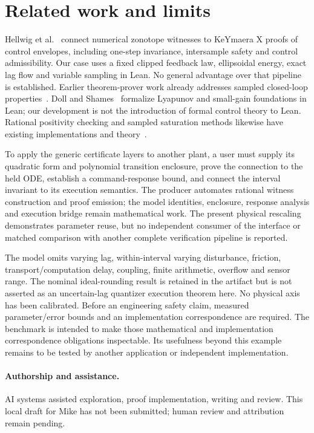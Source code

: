 \documentclass[10pt]{article}
\begin{document}
\section{Related work and limits}
Hellwig et al.~\cite{zonotope} connect numerical zonotope witnesses to KeYmaera X proofs of control envelopes, including one-step invariance, intersample safety and control admissibility. Our case uses a fixed clipped feedback law, ellipsoidal energy, exact lag flow and variable sampling in Lean. No general advantage over that pipeline is established. Earlier theorem-prover work already addresses sampled closed-loop properties~\cite{closedloop}. Doll and Shames~\cite{doll} formalize Lyapunov and small-gain foundations in Lean; our development is not the introduction of formal control theory to Lean. Rational positivity checking and sampled saturation methods likewise have existing implementations and theory~\cite{sos,palmeira}.

To apply the generic certificate layers to another plant, a user must supply its quadratic form and polynomial transition enclosure, prove the connection to the held ODE, establish a command-response bound, and connect the interval invariant to its execution semantics. The producer automates rational witness construction and proof emission; the model identities, enclosure, response analysis and execution bridge remain mathematical work. The present physical rescaling demonstrates parameter reuse, but no independent consumer of the interface or matched comparison with another complete verification pipeline is reported.

The model omits varying lag, within-interval varying disturbance, friction, transport/computation delay, coupling, finite arithmetic, overflow and sensor range. The nominal ideal-rounding result is retained in the artifact but is not asserted as an uncertain-lag quantizer execution theorem here. No physical axis has been calibrated. Before an engineering safety claim, measured parameter/error bounds and an implementation correspondence are required. The benchmark is intended to make those mathematical and implementation correspondence obligations inspectable. Its usefulness beyond this example remains to be tested by another application or independent implementation.

\paragraph{Authorship and assistance.}
AI systems assisted exploration, proof implementation, writing and review. This local draft for Mike has not been submitted; human review and attribution remain pending.
\end{document}
